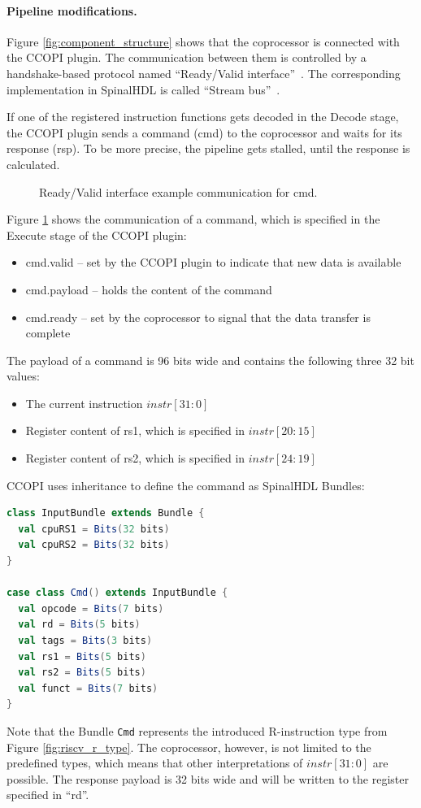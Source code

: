 \documentclass[twoside,twocolumn]{article}
\newcommand{\code}[1]{\texttt{#1}}
\begin{document}
\paragraph{Pipeline modifications.}
Figure \ref*{fig:component_structure} shows that the coprocessor 
is connected with the CCOPI plugin. The communication between them 
is controlled
by a handshake-based protocol named ``Ready/Valid
interface''~\cite{ready_valid}. The
corresponding implementation in SpinalHDL is called ``Stream
bus''~\cite{spinal_doc3}. 

If one of the registered instruction functions gets decoded in the
Decode stage, the CCOPI plugin sends a command (cmd) to the
coprocessor and waits for its response (rsp). To be more precise, the
pipeline gets stalled, until the response is calculated.
\begin{figure}[h]
    
    \caption{Ready/Valid interface example communication for cmd.}
    \label{fig:ready_valid}
\end{figure}

\noindent Figure \ref*{fig:ready_valid} shows the communication of a command,
which is specified in the Execute stage of the CCOPI plugin:
\begin{itemize}
    \item cmd.valid -- set by the CCOPI plugin to indicate that new data
        is available
    \item cmd.payload -- holds the content of the command
    \item cmd.ready -- set by the coprocessor to signal that the data
        transfer is complete
\end{itemize}
The payload of a command is 96 bits wide and contains the following
three 32 bit values:
\begin{itemize}
    \item The current instruction $instr[31:0]$
    \item Register content of rs1, which is specified in $instr[20:15]$
    \item Register content of rs2, which is specified in $instr[24:19]$
\end{itemize}
CCOPI uses inheritance to define the command as SpinalHDL Bundles:
\begin{lstlisting}[language=scala]
class InputBundle extends Bundle {
  val cpuRS1 = Bits(32 bits)
  val cpuRS2 = Bits(32 bits)
}

case class Cmd() extends InputBundle {
  val opcode = Bits(7 bits)
  val rd = Bits(5 bits)
  val tags = Bits(3 bits)
  val rs1 = Bits(5 bits)
  val rs2 = Bits(5 bits)
  val funct = Bits(7 bits)
}
\end{lstlisting}
Note that the Bundle \code{Cmd} represents the introduced R-instruction
type from Figure \ref*{fig:riscv_r_type}. The coprocessor,
however, is not limited to the predefined types, which means
that other interpretations of $instr[31:0]$ are possible.
The response payload is 32 bits wide and will be written to the register
specified in ``rd''.
\end{document}
